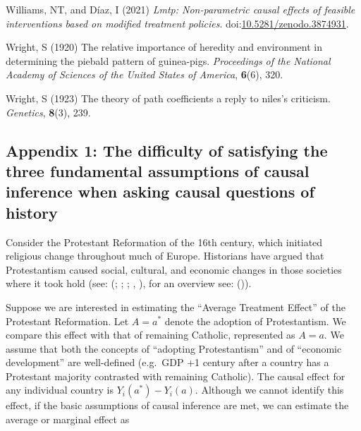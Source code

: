 \documentclass[
  singlecolumn,
  9pt]{article}
\begin{document}
\begin{CSLReferences}
Williams, NT, and Díaz, I (2021) \emph{Lmtp: Non-parametric causal
effects of feasible interventions based on modified treatment policies}.
doi:\href{https://doi.org/10.5281/zenodo.3874931}{10.5281/zenodo.3874931}.

Wright, S (1920) The relative importance of heredity and environment in
determining the piebald pattern of guinea-pigs. \emph{Proceedings of the
National Academy of Sciences of the United States of America},
\textbf{6}(6), 320.

Wright, S (1923) The theory of path coefficients a reply to niles's
criticism. \emph{Genetics}, \textbf{8}(3), 239.

\end{CSLReferences}

\newpage{}

\subsection{Appendix 1: The difficulty of satisfying the three
fundamental assumptions of causal inference when asking causal questions
of
history}\label{appendix-1-the-difficulty-of-satisfying-the-three-fundamental-assumptions-of-causal-inference-when-asking-causal-questions-of-history}

Consider the Protestant Reformation of the 16th century, which initiated
religious change throughout much of Europe. Historians have argued that
Protestantism caused social, cultural, and economic changes in those
societies where it took hold (see: (; ;
; , ), for an overview see:
()).

Suppose we are interested in estimating the ``Average Treatment Effect''
of the Protestant Reformation. Let \(A = a^*\) denote the adoption of
Protestantism. We compare this effect with that of remaining Catholic,
represented as \(A = a\). We assume that both the concepts of ``adopting
Protestantism'' and of ``economic development'' are well-defined
(e.g.~GDP +1 century after a country has a Protestant majority
contrasted with remaining Catholic). The causal effect for any
individual country is \(Y_i(a^*) - Y_i(a)\). Although we cannot identify
this effect, if the basic assumptions of causal inference are met, we
can estimate the average or marginal effect as
\end{document}
